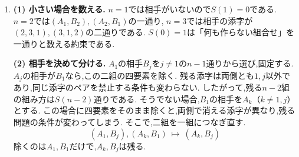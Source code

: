 \begin{enumerate}[label=\textbf{問\arabic*.},leftmargin=3.8em,format=\bookitemlink{practice-entrance}{solution}{problem}]
\[                  \]
                  となり,解答の式を得る.
                  \smallskip\textbf{(3)~整数性と方程式の確認.}
                  初期値と更新の係数から全項が整数である.
                  $u_2=6>u_1=3$であり,$u_{n+1}>u_n>0$なら$u_{n+2}>2u_{n+1}>u_{n+1}$となるため,
                  $n\ge1$で正値と厳密な増加が続く.
                  隣接する二項から作る
                  \[
                    I_n=u_n^2+u_{n+1}^2-3u_nu_{n+1}
                  \]
                  に更新式を入れると,
                  \[
                  \begin{aligned}
                    I_{n+1}&=u_{n+1}^2+(3u_{n+1}-u_n)^2\\
                           &\quad-3u_{n+1}(3u_{n+1}-u_n)=I_n.
                  \end{aligned}
                  \]
                  よって$I_n=I_0=-9$から$(3,u_n,u_{n+1})$は正の整数解となる.
                  増加するため解は互いに異なり,無限個得られる.ここでは全解の分類まではしていない.
                  最後に$0<\beta<1<\alpha$と$P,Q>0$から,
                  \[
                    \frac{u_{n+1}}{u_n}
                      =\alpha\,\cfrac{P+Q(\frac\beta\alpha)^{n+1}}
                                       {P+Q(\frac\beta\alpha)^n}
                      \longrightarrow\alpha.
                  \]
                  更新式は整数性を保証し,は整数の比が近づく無理数を示している.
          \item \textbf{(1) 小さい場合を数える.}
                  $n=1$では相手がいないので$S(1)=0$である.
                  $n=2$では$(A_1,B_2),(A_2,B_1)$の一通り,
                  $n=3$では相手の添字が$(2,3,1),(3,1,2)$の二通りである.
                  $S(0)=1$は「何も作らない組合せ」を一通りと数える約束である.
                  \par\smallskip\textbf{(2) 相手を決めて分ける.}
                  $A_1$の相手$B_j$を$j\ne1$の$n-1$通りから選び,固定する.
                  $A_j$の相手が$B_1$なら,この二組の四要素を除く.
                  残る添字は両側とも$1,j$以外であり,同じ添字のペアを禁止する条件も変わらない.
                  したがって,残る$n-2$組の組み方は$S(n-2)$通りである.
                  そうでない場合,$B_1$の相手を$A_k$（$k\ne1,j$）とする.
                  この場合に四要素をそのまま除くと,両側で消える添字が異なり,残る問題の条件が変わってしまう.
                  そこで,二組を一組につなぎ直す.
                  \[
                    (A_1,B_j),(A_k,B_1)\ \longmapsto\ (A_k,B_j)
                  \]
                  除くのは$A_1,B_1$だけで,$A_k,B_j$は残る.

\end{enumerate}
